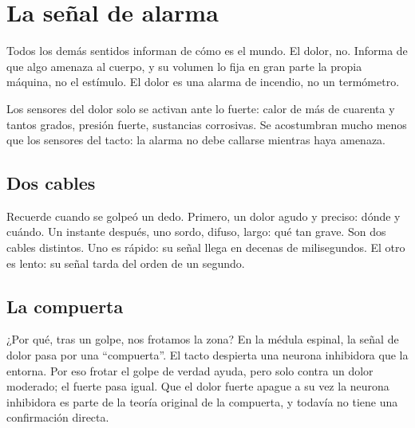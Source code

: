 \chapter{La señal de alarma}


Todos los demás sentidos informan de cómo es el mundo. El dolor, no. Informa de que algo amenaza al cuerpo, y su volumen lo fija en gran parte la propia máquina, no el estímulo. El dolor es una alarma de incendio, no un termómetro.

Los sensores del dolor solo se activan ante lo fuerte: calor de más de cuarenta y tantos grados, presión fuerte, sustancias corrosivas. Se acostumbran mucho menos que los sensores del tacto: la alarma no debe callarse mientras haya amenaza.

\section*{Dos cables}

Recuerde cuando se golpeó un dedo. Primero, un dolor agudo y preciso: dónde y cuándo. Un instante después, uno sordo, difuso, largo: qué tan grave. Son dos cables distintos. Uno es rápido: su señal llega en decenas de milisegundos. El otro es lento: su señal tarda del orden de un segundo.

\section*{La compuerta}

¿Por qué, tras un golpe, nos frotamos la zona? En la médula espinal, la señal de dolor pasa por una “compuerta”. El tacto despierta una neurona inhibidora que la entorna. Por eso frotar el golpe de verdad ayuda, pero solo contra un dolor moderado; el fuerte pasa igual. Que el dolor fuerte apague a su vez la neurona inhibidora es parte de la teoría original de la compuerta, y todavía no tiene una confirmación directa.



